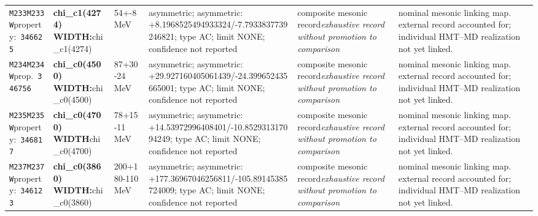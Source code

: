 \begin{landscape}
\begin{longtable}{L{1.85cm}L{4.45cm}L{2.35cm}L{4.05cm}L{3.35cm}L{7.15cm}}
\texttt{M233}\newline \texttt{M233W}\newline property:\ \texttt{346625} & \textbf{chi\_\allowbreak{}c1(4274) WIDTH:}\newline chi\_\allowbreak{}c1(4274) & 54+-8\,MeV & asymmetric; asymmetric: +8.1968525494933324/-7.7933837739246821; type AC; limit NONE; confidence not reported & composite mesonic record\newline \emph{exhaustive record without promotion to comparison} & nominal mesonic linking map. external record accounted for; individual HMT--MD realization not yet linked. \\
\texttt{M234}\newline \texttt{M234W}\newline prop.\ \texttt{346756} & \textbf{chi\_\allowbreak{}c0(4500) WIDTH:}\newline chi\_\allowbreak{}c0(4500) & 87+30-24\,MeV & asymmetric; asymmetric: +29.927160405061439/-24.399652435665001; type AC; limit NONE; confidence not reported & composite mesonic record\newline \emph{exhaustive record without promotion to comparison} & nominal mesonic linking map. external record accounted for; individual HMT--MD realization not yet linked. \\
\texttt{M235}\newline \texttt{M235W}\newline property:\ \texttt{346817} & \textbf{chi\_\allowbreak{}c0(4700) WIDTH}\newline chi\_\allowbreak{}c0(4700) & 78+15-11\,MeV & asymmetric; asymmetric: +14.53972996408401/-10.852931317094249; type AC; limit NONE; confidence not reported & composite mesonic record\newline \emph{exhaustive record without promotion to comparison} & nominal mesonic linking map. external record accounted for; individual HMT--MD realization not yet linked. \\
\texttt{M237}\newline \texttt{M237W}\newline property:\ \texttt{346123} & \textbf{chi\_\allowbreak{}c0(3860) WIDTH:}\newline chi\_\allowbreak{}c0(3860) & 200+180-110\,MeV & asymmetric; asymmetric: +177.36967046256811/-105.89145385724009; type AC; limit NONE; confidence not reported & composite mesonic record\newline \emph{exhaustive record without promotion to comparison} & nominal mesonic linking map. external record accounted for; individual HMT--MD realization not yet linked. \\

\end{longtable}
\end{landscape}
